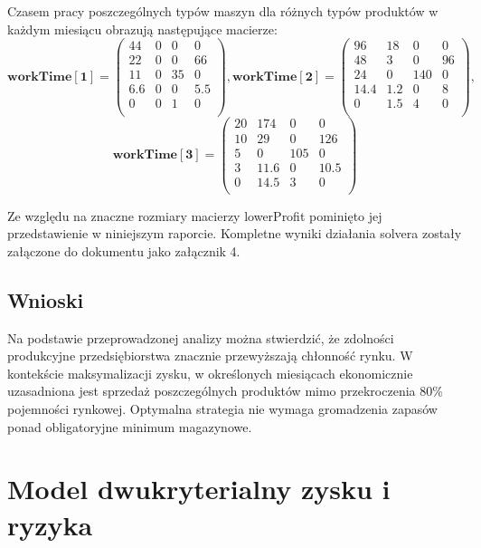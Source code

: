 \documentclass[11pt,a4paper]{article}
\begin{document}
Czasem pracy poszczególnych typów maszyn dla różnych typów produktów w każdym miesiącu obrazują następujące macierze:
\begin{displaymath}
 \mathbf{workTime[1]} =
 \begin{pmatrix}
	44 & 0 & 0 & 0 \\
	22 & 0 & 0 & 66 \\ 
	11 & 0 & 35 & 0 \\
	6.6 & 0 & 0 & 5.5 \\
	0 & 0 & 1 & 0 \\  
 \end{pmatrix},
 \mathbf{workTime[2]} =
 \begin{pmatrix}
	96 & 18 & 0 & 0 \\
	48 & 3 & 0 & 96 \\ 
	24 & 0 & 140 & 0 \\
	14.4 & 1.2 & 0 & 8 \\ 
	0 & 1.5 & 4 & 0 \\
 \end{pmatrix},
\end{displaymath}
\begin{displaymath}
 \mathbf{workTime[3]} =
 \begin{pmatrix}
	20 & 174 & 0 & 0 \\
	10 & 29 & 0 & 126 \\ 
	5 & 0 & 105 & 0 \\
	3 & 11.6 & 0 & 10.5 \\ 
	0 & 14.5 & 3 & 0 \\
 \end{pmatrix}
\end{displaymath}

Ze względu na znaczne rozmiary macierzy lowerProfit pominięto jej przedstawienie w niniejszym raporcie. Kompletne wyniki działania solvera zostały załączone do dokumentu jako załącznik 4.
\subsection{Wnioski}
Na podstawie przeprowadzonej analizy można stwierdzić, że zdolności produkcyjne przedsiębiorstwa znacznie przewyższają chłonność rynku. W kontekście maksymalizacji zysku, w określonych miesiącach ekonomicznie uzasadniona jest sprzedaż poszczególnych produktów mimo przekroczenia 80\% pojemności rynkowej. Optymalna strategia nie wymaga gromadzenia zapasów ponad obligatoryjne minimum magazynowe.

\section{Model dwukryterialny zysku i ryzyka}
\end{document}

